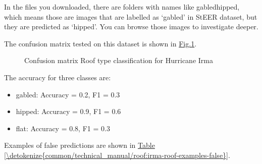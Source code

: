 \documentclass[letterpaper,10pt,english]{sphinxmanual}
\begin{document}
\sphinxAtStartPar
In the files you downloaded, there are folders with names like gabled\sphinxhyphen{}hipped, which means those are images that are labelled as ‘gabled’ in StEER dataset,
but they are predicted as ‘hipped’. You can browse those images to investigate deeper.

\sphinxAtStartPar
The confusion matrix tested on this dataset is shown in \hyperref[\detokenize{common/technical_manual/roof:fig-confusion-roof-irma}]{Fig.\@ \ref{\detokenize{common/technical_manual/roof:fig-confusion-roof-irma}}}.

\begin{figure}[htbp]
\centering
\capstart

\noindent{}
\caption{Confusion matrix \sphinxhyphen{} Roof type classification for Hurricane Irma}\label{\detokenize{common/technical_manual/roof:id11}}\label{\detokenize{common/technical_manual/roof:fig-confusion-roof-irma}}\end{figure}

\sphinxAtStartPar
The accuracy for three classes are:
\begin{itemize}
\item {} 
\sphinxAtStartPar
gabled: Accuracy = 0.2, F1 = 0.3

\item {} 
\sphinxAtStartPar
hipped: Accuracy = 0.9, F1 = 0.6

\item {} 
\sphinxAtStartPar
flat:   Accuracy = 0.8, F1 = 0.3

\end{itemize}

\sphinxAtStartPar
Examples of false predictions are shown in \hyperref[\detokenize{common/technical_manual/roof:irma-roof-examples-false}]{Table \ref{\detokenize{common/technical_manual/roof:irma-roof-examples-false}}}.
\end{document}
